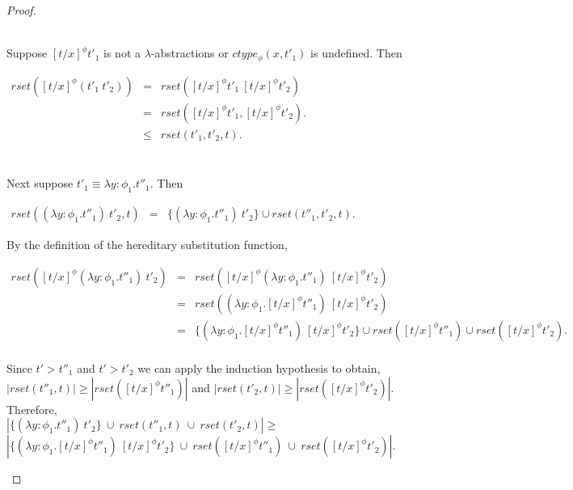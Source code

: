 \begin{proof}
\begin{itemize}
  \ \\
  \noindent
  Suppose $[t/x]^\phi t'_1$ is not a $\lambda$-abstractions or $ctype_\phi(x,t'_1)$ is undefined.  Then
  \begin{center}
    \begin{math}
      \begin{array}{lll}
        rset([t/x]^\phi (t'_1\ t'_2)) & = & rset([t/x]^\phi t'_1\ [t/x]^\phi t'_2)\\
        & = & rset([t/x]^\phi t'_1, [t/x]^\phi t'_2).\\
        & \leq & rset(t'_1, t'_2, t).\\
      \end{array}
    \end{math}
  \end{center}
  
  \ \\
  Next suppose $t'_1 \equiv \lambda y:\phi_1.t''_1$.  Then 
  \begin{center}
    \begin{math}
      \begin{array}{lll}
        rset((\lambda y:\phi_1.t''_1)\ t'_2, t) & = & \{ (\lambda y:\phi_1.t''_1)\ t'_2\} \cup rset(t''_1, t'_2, t).
      \end{array}
    \end{math}
  \end{center}
  By the definition of the hereditary substitution function,
  \begin{center}
    \begin{math}
      \begin{array}{lll}
        rset([t/x]^\phi (\lambda y:\phi_1.t''_1)\ t'_2) & = & rset([t/x]^\phi (\lambda y:\phi_1.t''_1)\ [t/x]^\phi t'_2)\\
        & = & rset((\lambda y:\phi_1.[t/x]^\phi t''_1)\ [t/x]^\phi t'_2)\\
        & = & \{(\lambda y:\phi_1.[t/x]^\phi t''_1)\ [t/x]^\phi t'_2\} \cup 
        rset([t/x]^\phi t''_1) \cup rset([t/x]^\phi t'_2).\\
        
      \end{array}
    \end{math}
  \end{center}
  Since $t' > t''_1$ and $t' > t'_2$ we can apply the induction hypothesis to obtain,
  $|rset(t''_1, t)| \geq |rset([t/x]^\phi t''_1)|$ and $|rset(t'_2,t)| \geq |rset([t/x]^\phi t'_2)|$.  Therefore, \\
  $|\{ (\lambda y:\phi_1.t''_1)\ t'_2\}\ \cup\ rset(t''_1,t)\ \cup\ rset(t'_2,t)| \geq $ 
  $|\{(\lambda y:\phi_1.[t/x]^\phi t''_1)\ [t/x]^\phi t'_2\}\ \cup\ rset([t/x]^\phi t''_1)\ \cup\ rset([t/x]^\phi t'_2)|$.
\end{itemize}
\end{proof}

